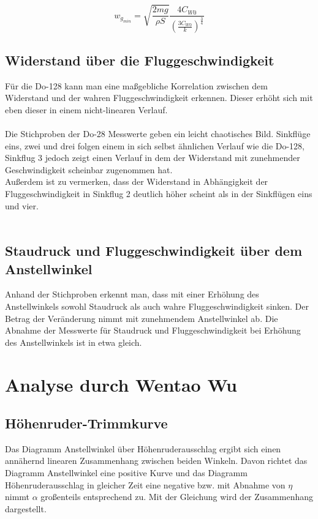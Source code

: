 \begin{equation*}
w_{g_{min}} = \sqrt{\frac{2mg}{\rho S}} \frac{4C_{W0}}{\left( \frac{3C_{W0}}{k}\right)^{\frac{3}{4}}}
\end{equation*}

\vspace{10mm}
\subsection{Widerstand über die Fluggeschwindigkeit}
Für die Do-128 kann man eine maßgebliche Korrelation zwischen dem Widerstand und der wahren Fluggeschwindigkeit erkennen. Dieser erhöht sich mit eben dieser in einem  nicht-linearen Verlauf.\\\\
Die Stichproben der Do-28 Messwerte geben ein leicht chaotisches Bild. Sinkflüge eins, zwei und drei folgen einem in sich selbst ähnlichen Verlauf wie die Do-128, Sinkflug 3 jedoch zeigt einen Verlauf in dem der Widerstand mit zunehmender Geschwindigkeit scheinbar zugenommen hat.\\
Außerdem ist zu vermerken, dass der Widerstand in Abhängigkeit der Fluggeschwindigkeit in Sinkflug 2 deutlich höher scheint als in der Sinkflügen eins und vier.\\\\

\subsection{Staudruck und Fluggeschwindigkeit über dem Anstellwinkel}
Anhand der Stichproben erkennt man, dass mit einer Erhöhung des Anstellwinkels sowohl Staudruck als auch wahre Fluggeschwindigkeit sinken. Der Betrag der Veränderung nimmt mit zunehmendem Anstellwinkel ab. Die Abnahme der Messwerte für Staudruck und Fluggeschwindigkeit bei Erhöhung des Anstellwinkels ist in etwa gleich.
\newpage

\section{Analyse durch Wentao Wu}
\subsection{Höhenruder-Trimmkurve}
Das Diagramm Anstellwinkel über Höhenruderausschlag ergibt sich einen annähernd linearen Zusammenhang zwischen beiden Winkeln. Davon richtet das Diagramm Anstellwinkel eine positive Kurve und das Diagramm Höhenruderausschlag in gleicher Zeit eine negative bzw. mit Abnahme von $\eta$ nimmt $\alpha$ großenteils entsprechend zu. Mit der Gleichung wird der Zusammenhang dargestellt.

